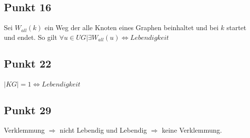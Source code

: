 \documentclass[10pt]{scrartcl}
\begin{document}
		\subsection{Punkt 16}
		Sei $W_{all}(k)$ ein Weg der alle Knoten eines Graphen beinhaltet und bei $k$ startet und endet.
		So gilt $\forall u \in UG | \exists  W_{all}(u) \Longleftrightarrow \textit{Lebendigkeit}$		
		
		\subsection{Punkt 22}
		$|KG| = 1 \Longleftrightarrow Lebendigkeit$	
		
		\subsection{Punkt 29}
		Verklemmung $\Longrightarrow$ nicht Lebendig und Lebendig $\Longrightarrow$ keine Verklemmung.
		
\end{document}
